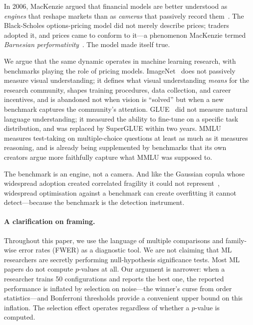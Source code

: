 \documentclass{article}
\begin{document}
In 2006, MacKenzie argued that financial models are better understood as \textit{engines} that reshape markets than as \textit{cameras} that passively record them~\citep{mackenzie_engine_2006}. The Black-Scholes options-pricing model did not merely describe prices; traders adopted it, and prices came to conform to it---a phenomenon MacKenzie termed \textit{Barnesian performativity}~\citep{mackenzie_millo_2003}. The model made itself true.

We argue that the same dynamic operates in machine learning research, with benchmarks playing the role of pricing models. ImageNet~\citep{deng_imagenet_2009} does not passively measure visual understanding; it defines what visual understanding \textit{means} for the research community, shapes training procedures, data collection, and career incentives, and is abandoned not when vision is ``solved'' but when a new benchmark captures the community's attention. GLUE~\citep{wang_glue_2018} did not measure natural language understanding; it measured the ability to fine-tune on a specific task distribution, and was replaced by SuperGLUE within two years. MMLU~\citep{hendrycks_mmlu_2021} measures test-taking on multiple-choice questions at least as much as it measures reasoning, and is already being supplemented by benchmarks that its own creators argue more faithfully capture what MMLU was supposed to.

The benchmark is an engine, not a camera. And like the Gaussian copula whose widespread adoption created correlated fragility it could not represent~\citep{mackenzie_bamford_2018}, widespread optimisation against a benchmark can create overfitting it cannot detect---because the benchmark is the detection instrument.

\paragraph{A clarification on framing.} Throughout this paper, we use the language of multiple comparisons and family-wise error rates (FWER) as a diagnostic tool. We are not claiming that ML researchers are secretly performing null-hypothesis significance tests. Most ML papers do not compute $p$-values at all. Our argument is narrower: when a researcher trains 50 configurations and reports the best one, the reported performance is inflated by selection on noise---the winner's curse from order statistics---and Bonferroni thresholds provide a convenient upper bound on this inflation. The selection effect operates regardless of whether a $p$-value is computed.
\end{document}
